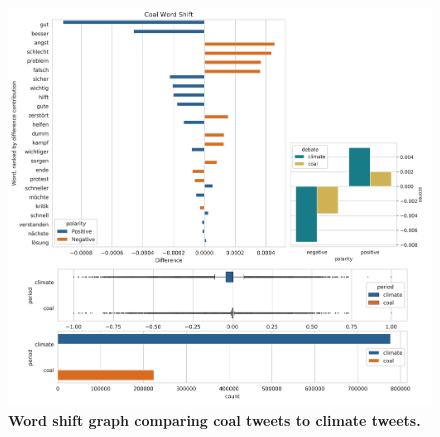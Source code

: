\documentclass[12pt,onecolumn,twoside]{layout}
\begin{document}
\begin{figure} 
	\begin{center}
		\includegraphics[width=\linewidth]{figures/wordshift_coal_climate_composite}
	\end{center}
	\caption{\textbf{Word shift graph comparing coal tweets to climate tweets.}}
	\label{fig:wordshift_coal_climate}
\end{figure}
\end{document}
